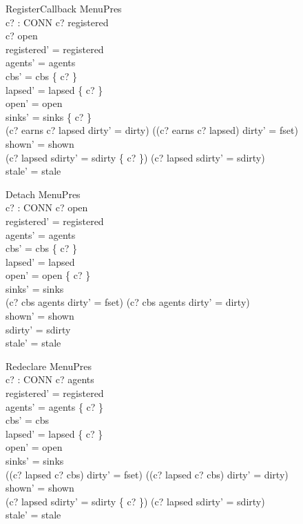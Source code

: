 \documentclass[a4paper,10pt,fleqn]{article}
\begin{document}
\begin{schema}{RegisterCallback}
  \Delta MenuPres \\
  c? : CONN
\where
  c? \in registered \\
  c? \in open \\
  registered' = registered \\
  agents' = agents \\
  cbs' = cbs \cup \{ c? \} \\
  lapsed' = lapsed \setminus \{ c? \} \\
  open' = open \\
  sinks' = sinks \oplus \{ c?  \} \\
  (c? \in earns \land c? \notin lapsed \land dirty' = dirty) \lor
    ((c? \notin earns \lor c? \in lapsed) \land dirty' = fset) \\
  shown' = shown \\
  (c? \in lapsed \land sdirty' = sdirty \cup \{ c? \}) \lor
    (c? \notin lapsed \land sdirty' = sdirty) \\
  stale' = stale
\end{schema}

\begin{schema}{Detach}
  \Delta MenuPres \\
  c? : CONN
\where
  c? \in open \\
  registered' = registered \\
  agents' = agents \\
  cbs' = cbs \setminus \{ c? \} \\
  lapsed' = lapsed \\
  open' = open \setminus \{ c? \} \\
  sinks' = sinks \\
  (c? \in cbs \setminus agents \land dirty' = fset) \lor
    (c? \notin cbs \setminus agents \land dirty' = dirty) \\
  shown' = shown \\
  sdirty' = sdirty \\
  stale' = stale
\end{schema}

\begin{schema}{Redeclare}
  \Delta MenuPres \\
  c? : CONN
\where
  c? \in agents \\
  registered' = registered \\
  agents' = agents \setminus \{ c? \} \\
  cbs' = cbs \\
  lapsed' = lapsed \setminus \{ c? \} \\
  open' = open \\
  sinks' = sinks \\
  ((c? \in lapsed \lor c? \notin cbs) \land dirty' = fset) \lor
    (\lnot (c? \in lapsed \lor c? \notin cbs) \land dirty' = dirty) \\
  shown' = shown \\
  (c? \in lapsed \land sdirty' = sdirty \cup \{ c? \}) \lor
    (c? \notin lapsed \land sdirty' = sdirty) \\
  stale' = stale
\end{schema}
\end{document}
